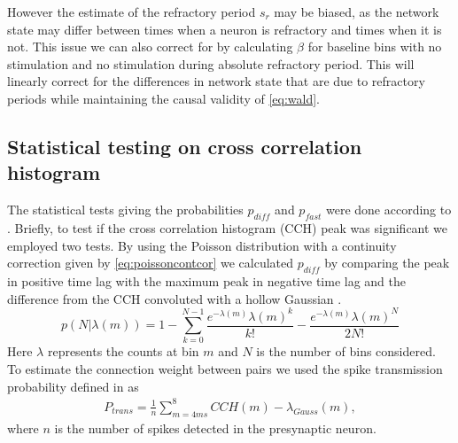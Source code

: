 \documentclass[11pt]{article}
\begin{document}
However the estimate of the refractory period $ s_r $ may be biased, as the network state may differ between times when a neuron is refractory and times when it is not. This issue we can also correct for by calculating $ \beta $ for baseline bins with no stimulation and no stimulation during absolute refractory period. This will linearly correct for the differences in network state that are due to refractory periods while maintaining the causal validity of \cref{eq:wald}.


\subsection{Statistical testing on cross correlation histogram}
The statistical tests giving the probabilities $ p_{diff} $ and $ p_{fast} $ were done according to \cite{Stark2009, English2017}. Briefly, to test if the cross correlation histogram (CCH) peak was significant we employed two tests. By using the Poisson distribution with a continuity correction \cite{Stark2009} given by \cref{eq:poissoncontcor} we calculated $ p_{diff} $ by comparing the peak in positive time lag with the maximum peak in negative time lag \cite{English2017} and the difference from the CCH convoluted with a hollow Gaussian \cite{Stark2009}.
\begin{equation}
p(N|\lambda(m)) = 1 - \sum_{k=0}^{N-1}\frac{e^{-\lambda(m)}\lambda(m)^k}{k!} - \frac{e^{-\lambda(m)}\lambda(m)^N}{2N!}
\label{eq:poissoncontcor}
\end{equation}
Here $ \lambda $ represents the counts at bin $ m $ and $ N $ is the number of bins considered. To estimate the connection weight between pairs we used the spike transmission probability defined in \cite{English2017} as 
\begin{align}
P_{trans} = \frac{1}{n}\sum_{m=4ms}^{8} CCH(m) - \lambda_{Gauss}(m),
\end{align}
where $ n $ is the number of spikes detected in the presynaptic neuron.
\end{document}
